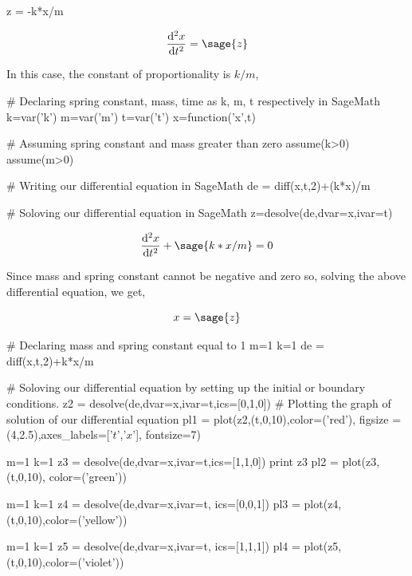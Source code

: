 \begin{sagesilent}
z = -k*x/m
\end{sagesilent}

\begin{equation}
\frac{\mathrm{d}^{2}x}{\mathrm{d}t^{2}} = \sage{z}
\end{equation}

In this case, the constant of proportionality is $k/m$,

\begin{sagesilent}
# Declaring spring constant, mass, time as k, m, t respectively in SageMath
k=var('k')
m=var('m')
t=var('t')
x=function('x',t)

# Assuming spring constant and mass greater than zero
assume(k>0)
assume(m>0)

# Writing our differential equation in SageMath
de = diff(x,t,2)+(k*x)/m

# Soloving our differential equation in SageMath
z=desolve(de,dvar=x,ivar=t)
\end{sagesilent}

%

\begin{equation}
  \frac{\mathrm{d}^{2}x}{\mathrm{d}t^{2}} +  \sage{k*x/m} = 0
\end{equation}

Since mass and spring constant cannot be negative and zero so, solving the above differential equation, we get,

\begin{equation}
x = \sage{z}
\end{equation}

\begin{sagesilent}
# Declaring mass and spring constant equal to 1
m=1
k=1
de = diff(x,t,2)+k*x/m

# Soloving our differential equation by setting up the initial or boundary conditions.
z2 = desolve(de,dvar=x,ivar=t,ics=[0,1,0])
# Plotting the graph of solution of our differential equation
pl1 = plot(z2,(t,0,10),color=('red'), figsize = (4,2.5),axes_labels=['$t$','$x$'], fontsize=7)

m=1
k=1
z3 = desolve(de,dvar=x,ivar=t,ics=[1,1,0])
print z3
pl2 = plot(z3,(t,0,10), color=('green'))

m=1
k=1
z4 = desolve(de,dvar=x,ivar=t, ics=[0,0,1])
pl3 = plot(z4,(t,0,10),color=('yellow'))

m=1
k=1
z5 = desolve(de,dvar=x,ivar=t, ics=[1,1,1])
pl4 = plot(z5,(t,0,10),color=('violet'))
\end{sagesilent}

